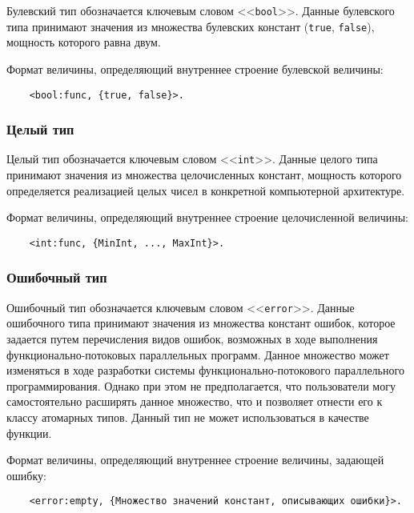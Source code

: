 {Булевский тип обозначается ключевым словом <<\verb|bool|>>. Данные булевского типа принимают значения из множества булевских констант (\verb|true|, \verb|false|), мощность которого равна двум.

Формат величины, определяющий внутреннее строение булевской величины:

\begin{verbatim}
    <bool:func, {true, false}>.
\end{verbatim}

\subsubsection{Целый тип}

Целый тип обозначается ключевым словом <<\verb|int|>>. Данные целого типа принимают значения из множества целочисленных констант, мощность которого определяется реализацией целых чисел в конкретной компьютерной архитектуре.

Формат величины, определяющий внутреннее строение целочисленной величины:

\begin{verbatim}
    <int:func, {MinInt, ..., MaxInt}>.
\end{verbatim}

\subsubsection{Ошибочный тип}

Ошибочный тип обозначается ключевым словом <<\verb|error|>>. Данные ошибочного типа принимают значения из множества констант ошибок, которое задается путем перечисления видов ошибок, возможных в ходе выполнения функционально-потоковых параллельных программ. Данное множество может изменяться в ходе разработки системы функционально-потокового параллельного программирования. Однако при этом не предполагается, что пользователи могу самостоятельно расширять данное множество, что и позволяет отнести его к классу атомарных типов. Данный тип не может использоваться в качестве функции.

Формат величины, определяющий внутреннее строение величины, задающей ошибку:

\begin{verbatim}
	<error:empty, {Множество значений констант, описывающих ошибки}>.
\end{verbatim}


}
